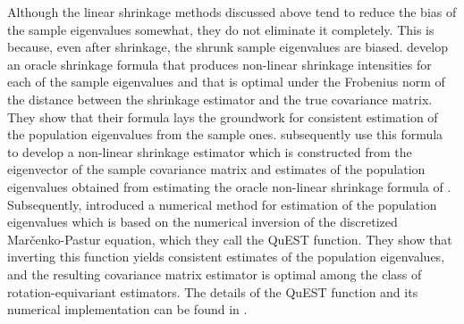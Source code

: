 Although the linear shrinkage methods discussed above tend to reduce the bias of the sample eigenvalues somewhat, they do not eliminate it completely. This is because, even after shrinkage, the shrunk sample eigenvalues are biased. \textcite{LEDOITPECHE2011} develop an oracle shrinkage formula that produces non-linear shrinkage intensities for each of the sample eigenvalues and that is optimal under the Frobenius norm of the distance between the shrinkage estimator and the true covariance matrix. They show that their formula lays the groundwork for consistent estimation of the population eigenvalues from the sample ones. \textcite{LEDOITWOLF2012} subsequently use this formula to develop a non-linear shrinkage estimator which is constructed from the eigenvector of the sample covariance matrix and estimates of the population eigenvalues obtained from estimating the oracle non-linear shrinkage formula of \textcite{LEDOITPECHE2011}. Subsequently, \textcite{LEDOITWOLF2015} introduced a numerical method for estimation of the population eigenvalues which is based on the numerical inversion of the discretized Marčenko-Pastur equation, which they call the QuEST function. They show that inverting this function yields consistent estimates of the population eigenvalues, and the resulting covariance matrix estimator is optimal among the class of rotation-equivariant estimators. The details of the QuEST function and its numerical implementation can be found in \textcite{LEDOITWOLF2017_QUEST}.

